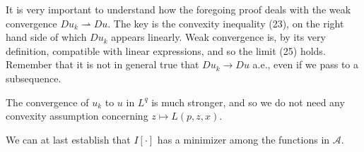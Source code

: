 \begin{remark}
\label{rem:weak-lower-semicontinuity-proof-remark}
It is very important to understand how the foregoing proof deals with the weak convergence $Du_k \rightharpoonup Du$. The key is the convexity inequality (23), on the right hand side of which $Du_k$ appears linearly. Weak convergence is, by its very definition, compatible with linear expressions, and so the limit (25) holds. Remember that it is not in general true that $Du_k \to Du$ a.e., even if we pass to a subsequence.

The convergence of $u_k$ to $u$ in $L^q$ is much stronger, and so we do not need any convexity assumption concerning $z \mapsto L(p, z, x)$.
\end{remark}

We can at last establish that $I[\cdot]$ has a minimizer among the functions in $\mathcal{A}$.

